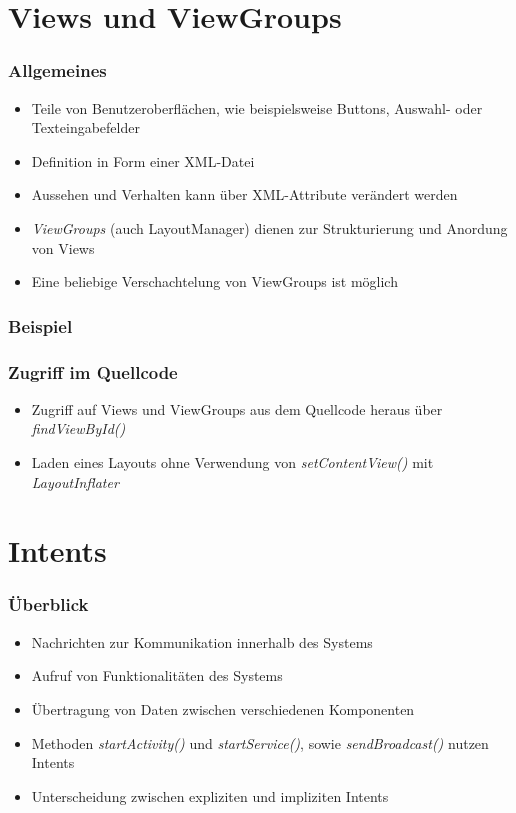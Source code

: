 \section{Views und ViewGroups}
\begin{frame}[label=views]
   \frametitle{Allgemeines}
   \begin{itemize}
      \item Teile von Benutzeroberflächen, wie beispielsweise Buttons, Auswahl- 
         oder Texteingabefelder
      \item Definition in Form einer XML-Datei
      \item Aussehen und Verhalten kann über XML-Attribute verändert werden
      \item \emph{ViewGroups} (auch LayoutManager) dienen zur Strukturierung und Anordung 
         von Views
      \item Eine beliebige Verschachtelung von ViewGroups ist möglich
   \end{itemize}
\end{frame}

\begin{frame}[label=access_views]
   \frametitle{Beispiel}

   
\end{frame}

\begin{frame}[label=access_views]
   \frametitle{Zugriff im Quellcode}
   \begin{itemize}
      \item Zugriff auf Views und ViewGroups aus dem Quellcode heraus über \emph{findViewById()}
      \item Laden eines Layouts ohne Verwendung von \emph{setContentView()} mit \emph{LayoutInflater}
   \end{itemize}

   
\end{frame}

\section{Intents}
\begin{frame}[label=intents]
   \frametitle{Überblick}
   \begin{itemize}
      \item Nachrichten zur Kommunikation innerhalb des Systems
      \item Aufruf von Funktionalitäten des Systems
      \item Übertragung von Daten zwischen verschiedenen Komponenten
      \item Methoden \emph{startActivity()} und \emph{startService()}, sowie 
         \emph{sendBroadcast()} nutzen Intents
      \item Unterscheidung zwischen expliziten und impliziten Intents
   \end{itemize}
\end{frame}

